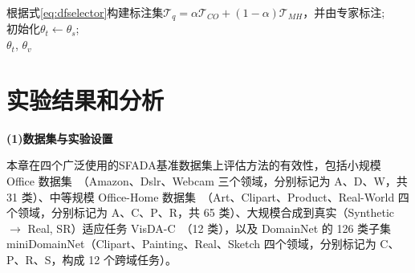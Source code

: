 \begin{algorithm}[!htb]
    \label{alg:damf}
    \small
    \BlankLine
    根据式\eqref{eq:dfselector}构建标注集$\mathcal{T}_q = \alpha\mathcal{T}_{CO} + (1-\alpha)\mathcal{T}_{MH}$，并由专家标注;\\
    \BlankLine
    \BlankLine
    初始化$\theta_t\leftarrow\theta_s$;\\
    \Return $\theta_t$, $\theta_v$
\end{algorithm}

\section{实验结果和分析}

\noindent\textbf{(1)数据集与实验设置}

本章在四个广泛使用的SFADA基准数据集上评估方法的有效性，包括小规模 Office 数据集~\cite{saenko2010adapting}（Amazon、Dslr、Webcam 三个领域，分别标记为 A、D、W，共 31 类）、中等规模 Office-Home 数据集~\cite{venkateswara2017deep}（Art、Clipart、Product、Real-World 四个领域，分别标记为 A、C、P、R，共 65 类）、大规模合成到真实（Synthetic $\rightarrow$ Real, SR）适应任务 VisDA-C~\cite{peng2017visda}（12 类），以及 DomainNet 的 126 类子集 miniDomainNet（Clipart、Painting、Real、Sketch 四个领域，分别标记为 C、P、R、S，构成 12 个跨域任务）。

